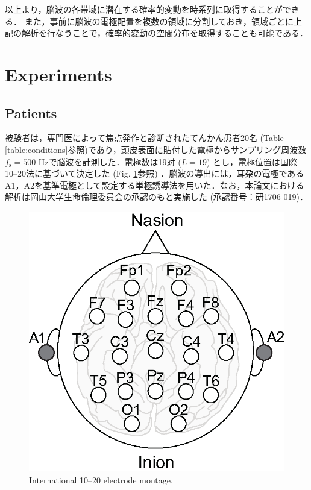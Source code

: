 \documentclass[journal]{IEEEtran}
\begin{document}
以上より，脳波の各帯域に潜在する確率的変動を時系列に取得することができる．
また，事前に脳波の電極配置を複数の領域に分割しておき，領域ごとに上記の解析を行なうことで，確率的変動の空間分布を取得することも可能である．
\section{Experiments}
\subsection{Patients}
被験者は，専門医によって焦点発作と診断されたてんかん患者20名 (Table \ref{table:conditions}参照)であり，頭皮表面に貼付した電極からサンプリング周波数$f_\mathrm{s} = 500$ Hzで脳波を計測した．電極数は19対 ($L=19$) とし，電極位置は国際10--20法に基づいて決定した (Fig. \ref{fig:electrodes}参照) ．脳波の導出には，耳朶の電極であるA1，A2を基準電極として設定する単極誘導法を用いた．なお，本論文における解析は岡山大学生命倫理委員会の承認のもと実施した (承認番号：研1706-019)．


\begin{figure}[!t]
\centering
\includegraphics[width=0.6\hsize]{figure/electrodes.eps}
\caption{International 10--20 electrode montage.}
\label{fig:electrodes}
\end{figure}
\end{document}
